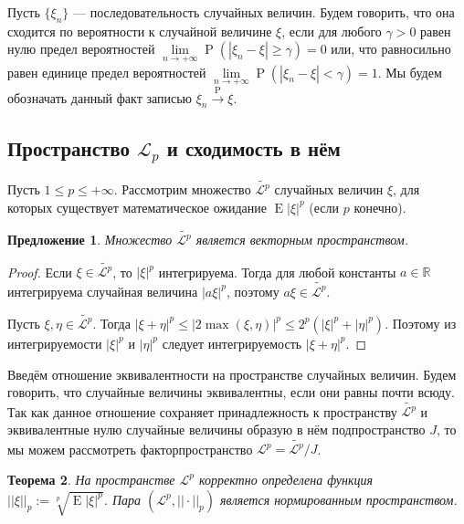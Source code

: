 \documentclass[12pt]{article}
\newtheorem{theorem}{Теорема}
\newtheorem{proposition}[theorem]{Предложение}
\numberwithin{theorem}{section}
\theoremstyle{definition}
\newcommand{\defin}[2]{\hypertarget{#2}{{\color{red} #1}}}
\newcommand{\RR}{\mathbb{R}}
\newcommand{\prob}{\operatorname{P}}
\newcommand{\expect}{\operatorname{E}}
\begin{document}
	Пусть $ \{\xi_n\} $ --- последовательность случайных величин.
	Будем говорить, что она \defin{сходится по вероятности}{in-pobability} к случайной величине $ \xi $,
	если для любого $ \gamma > 0 $ 
	равен нулю предел вероятностей $ \lim\limits_{n \to +\infty} \prob(|\xi_n - \xi| \geqslant \gamma) = 0 $
	или, что равносильно равен единице предел вероятностей
	$ \lim\limits_{n \to +\infty} \prob(|\xi_n - \xi| < \gamma) = 1 $.
	Мы будем обозначать данный факт записью $ \xi_n \overset{\prob}{\to} \xi $.
	
	\subsection{Пространство $ \mathcal{L}_p $ и сходимость в нём}
	
	Пусть $ 1 \leqslant p \leqslant +\infty $.
	Рассмотрим множество $ \tilde{\mathcal{L}^p} $ случайных величин $ \xi $, 
	для которых существует математическое ожидание $ \expect|\xi|^p $ (если $ p $ конечно).
	
	\begin{proposition}
		Множество $ \tilde{\mathcal{L}^p} $ является векторным пространством.
	\end{proposition}	
	
	\begin{proof}
		Если $ \xi \in \tilde{\mathcal{L}^p} $, то $ |\xi|^p $ интегрируема.
		Тогда для любой константы $ a \in \RR $ интегрируема случайная величина $ |a\xi|^p $,
		поэтому $ a\xi \in \tilde{\mathcal{L}^p} $.
		
		Пусть $ \xi, \eta \in \tilde{\mathcal{L}^p} $.
		Тогда $ |\xi + \eta|^p \leqslant |2\max(\xi, \eta)|^p \leqslant 2^p(|\xi|^p + |\eta|^p) $.
		Поэтому из интегрируемости $ |\xi|^p $ и $ |\eta|^p $ следует интегрируемость
		$ |\xi + \eta|^p $.
	\end{proof}
	
	Введём отношение эквивалентности на пространстве случайных величин.
	Будем говорить, что случайные величины эквивалентны, если они равны почти всюду.
	Так как данное отношение сохраняет принадлежность к пространству $ \tilde{\mathcal{L}^p} $
	и эквивалентные нулю случайные величины образую в нём подпространство $ J $,
	то мы можем рассмотреть факторпространство $ \mathcal{L}^p = \tilde{\mathcal{L}^p}/J $.
	
	\begin{theorem}
		На пространстве $ \mathcal{L}^p $ корректно определена
		функция $ ||\xi||_p := \sqrt[p]{\expect|\xi|^p} $.
		Пара $ (\mathcal{L}^p, ||\cdot||_p) $ является нормированным пространством.
	\end{theorem}
	
\end{document}
